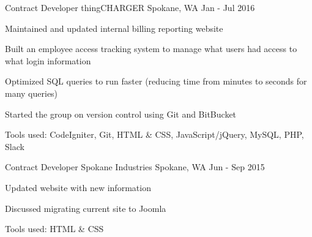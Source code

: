 \begin{cventries}
  \cventry
    {Contract Developer} %
    {thingCHARGER} %
    {Spokane, WA} %
    {Jan - Jul 2016} %
    {
      \begin{cvitems} %
        \item {Maintained and updated internal billing reporting website}
        \item {Built an employee access tracking system to manage what users had access to what login information}
        \item {Optimized SQL queries to run faster (reducing time from minutes to seconds for many queries)}
        \item {Started the group on version control using Git and BitBucket}
        \item {Tools used: CodeIgniter, Git, HTML \& CSS, JavaScript/jQuery, MySQL, PHP, Slack}
      \end{cvitems}
    }

  \cventry
    {Contract Developer} %
    {Spokane Industries} %
    {Spokane, WA} %
    {Jun - Sep 2015} %
    {
      \begin{cvitems} %
        \item {Updated website with new information}
        \item {Discussed migrating current site to Joomla}
        \item {Tools used: HTML \& CSS}
      \end{cvitems}
    }


\end{cventries}
